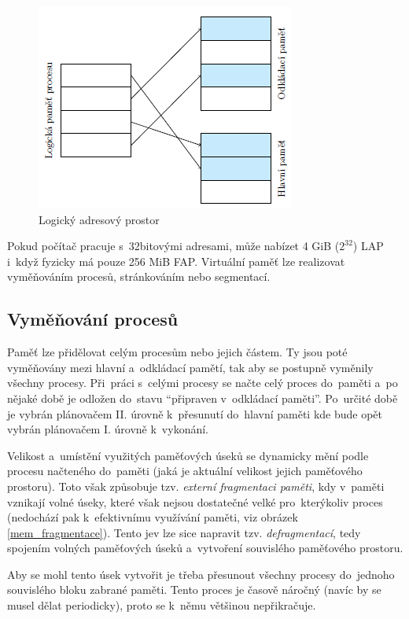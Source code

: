 \begin{figure}[ht]
	\centering
	\includegraphics[scale=1]{images/mem_lap.png}
	\caption{Logický adresový prostor}
	\label{mem_lap}
\end{figure}

Pokud počítač pracuje s~32bitovými adresami, může nabízet 4 GiB ($2^{32}$) LAP i~když fyzicky má pouze 256 MiB FAP. Virtuální paměť lze realizovat vyměňováním procesů, stránkováním nebo segmentací.

\subsection{Vyměňování procesů}

Paměť lze přidělovat celým procesům nebo jejich částem. Ty jsou poté vyměňovány mezi hlavní a~odkládací pamětí, tak aby se postupně vyměnily všechny procesy. Při~práci s~celými procesy se načte celý proces do~paměti a~po nějaké době je odložen do~stavu \enquote{připraven v~odkládací paměti}. Po~určité době je vybrán plánovačem II. úrovně k~přesunutí do~hlavní paměti kde bude opět vybrán plánovačem I. úrovně k~vykonání.

Velikost a~umístění využitých paměťových úseků se dynamicky mění podle procesu načteného do~paměti (jaká je aktuální velikost jejich paměťového prostoru). Toto však způsobuje tzv. \emph{externí fragmentaci paměti}, kdy v~paměti vznikají volné úseky, které však nejsou dostatečné velké pro~kterýkoliv proces (nedochází pak k~efektivnímu využívání paměti, viz obrázek \ref{mem_fragmentace}). Tento jev lze sice napravit tzv. \emph{defragmentací}, tedy spojením volných paměťových úseků a~vytvoření souvislého paměťového prostoru.

Aby se mohl tento úsek vytvořit je třeba přesunout všechny procesy do~jednoho souvislého bloku zabrané paměti. Tento proces je časově náročný (navíc by se musel dělat periodicky), proto se k~němu většinou nepřikračuje.

